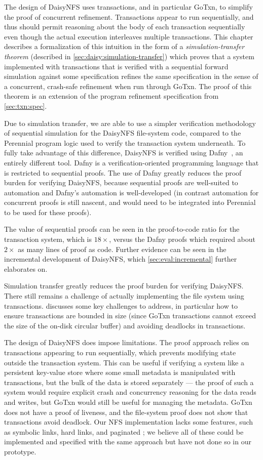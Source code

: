 The design of DaisyNFS uses transactions, and in particular GoTxn, to simplify
the proof of concurrent refinement. Transactions appear to run
sequentially, and thus should permit reasoning about the body of each
transaction sequentially even though the actual execution interleaves multiple
transactions. This chapter describes a formalization of this intuition in the
form of a \emph{simulation-transfer theorem} (described in
\cref{sec:daisy:simulation-transfer}) which proves that a system implemented
with transactions that is verified with a sequential forward simulation against
some specification refines the same specification in the sense of a concurrent,
crash-safe refinement when run through GoTxn. The proof of this theorem is an
extension of the program refinement specification from \cref{sec:txn:spec}.

Due to simulation transfer, we are able to use a simpler verification
methodology of sequential simulation for the DaisyNFS file-system code, compared
to the Perennial program logic used to verify the transaction system underneath.
To fully take advantage of this difference, DaisyNFS is verified using
Dafny~\cite{leino:dafny}, an entirely different tool. Dafny is a
verification-oriented programming language that is restricted to sequential
proofs. The use of Dafny greatly reduces the proof burden for verifying
DaisyNFS, because sequential proofs are well-suited to automation and Dafny's
automation is well-developed (in contrast automation for concurrent proofs is
still nascent, and would need to be integrated into Perennial to be used for
these proofs).

The value of sequential proofs can be seen in the proof-to-code ratio for the
transaction system, which is $18\times$, versus the Dafny proofs which required
about $2\times$ as many lines of proof as code. Further evidence can be seen in
the incremental development of DaisyNFS, which \cref{sec:eval:incremental}
further elaborates on.

Simulation transfer greatly reduces the proof burden for verifying DaisyNFS.
There still remains a challenge of actually implementing the file system using
transactions.  discusses some key challenges to address,
in particular how to ensure transactions are bounded in size (since GoTxn
transactions cannot exceed the size of the on-disk circular buffer) and avoiding
deadlocks in transactions.

The design of DaisyNFS does impose limitations. The proof approach relies on
transactions appearing to run sequentially, which prevents modifying state
outside the transaction system. This can be useful if verifying a system like a
persistent key-value store where some small metadata is manipulated with transactions, but
the bulk of the data is stored separately --- the proof of such a system would
require explicit crash and concurrency reasoning for the data reads and writes,
but GoTxn would still be useful for managing the metadata. GoTxn does not have a proof of liveness, and the file-system proof
does not show that transactions avoid deadlock. Our NFS implementation lacks
some features, such as symbolic links, hard links, and paginated ;
we believe all of these could be implemented and specified with the same
approach but have not done so in our prototype.
